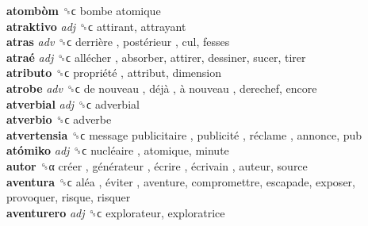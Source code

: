 \textbf{atombòm} ␝ϲ   bombe atomique   \\
\textbf{atraktivo} \emph{adj}  ␝ϲ  attirant, attrayant  \\
\textbf{atras} \emph{adv}  ␝ϲ   derrière ,  postérieur , cul, fesses  \\
\textbf{atraé} \emph{adj}  ␝ϲ   allécher , absorber, attirer, dessiner, sucer, tirer  \\
\textbf{atributo} ␝ϲ   propriété , attribut, dimension  \\
\textbf{atrobe} \emph{adv}  ␝ϲ   de nouveau ,  déjà ,  à nouveau , derechef, encore  \\
\textbf{atverbial} \emph{adj}  ␝ϲ  adverbial  \\
\textbf{atverbio} ␝ϲ  adverbe  \\
\textbf{atvertensia} ␝ϲ   message publicitaire ,  publicité ,  réclame , annonce, pub  \\
\textbf{atómiko} \emph{adj}  ␝ϲ   nucléaire , atomique, minute  \\
\textbf{autor} ␝α   créer ,  générateur ,  écrire ,  écrivain , auteur, source  \\
\textbf{aventura} ␝ϲ   aléa ,  éviter , aventure, compromettre, escapade, exposer, provoquer, risque, risquer  \\
\textbf{aventurero} \emph{adj}  ␝ϲ  explorateur, exploratrice  \\
